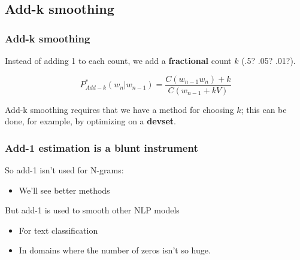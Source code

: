 \documentclass[13.5pt,aspecratio=169]{beamer}
\begin{document}
\subsection{Add-k smoothing}
\begin{frame}
    \onehalfspacing
        \frametitle{Add-k smoothing}
        {\Large Instead of adding 1 to each count, we add a \textbf{fractional} count $k$ (.5? .05? .01?). } \vspace{-2em}

        \begin{center} 
            \[ P^*_{Add-k} (w_n | w_{n-1}) = \frac{C(w_{n-1} w_n) + k}{C(w_{n-1} + kV)} \]
          \end{center}

       \begin{block}{}
        Add-k smoothing requires that we have a method for choosing $k$; this can be done, for example, by optimizing on a \textbf{devset}.

       \end{block}
    \end{frame}
    


\begin{frame}
\onehalfspacing
	\frametitle{Add-1 estimation is a blunt instrument}
    {\Large So add-1 isn’t used for N-grams:}
    \begin{itemize}
        \item {\large We’ll see better methods}

    \end{itemize}
    \vspace{3em}
    {\Large But add-1 is used to smooth other NLP models}
    \begin{itemize}
        \item {\large For text classification}
        \item {\large In domains where the number of zeros isn’t so huge.}
    \end{itemize}

   
\end{frame}

\end{document}
